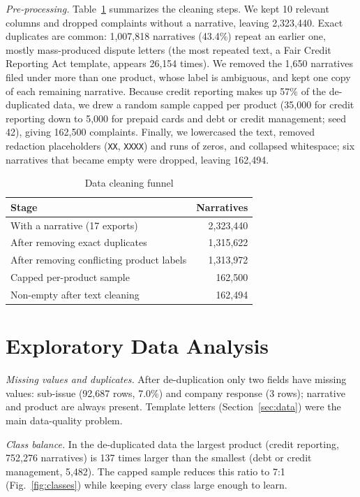 \documentclass[conference]{IEEEtran}
\begin{document}
\textit{Pre-processing.} Table~\ref{tab:funnel} summarizes the cleaning steps. We kept 10 relevant columns and dropped complaints without a narrative, leaving 2,323,440. Exact duplicates are common: 1,007,818 narratives (43.4\%) repeat an earlier one, mostly mass-produced dispute letters (the most repeated text, a Fair Credit Reporting Act template, appears 26,154 times). We removed the 1,650 narratives filed under more than one product, whose label is ambiguous, and kept one copy of each remaining narrative. Because credit reporting makes up 57\% of the de-duplicated data, we drew a random sample capped per product (35,000 for credit reporting down to 5,000 for prepaid cards and debt or credit management; seed 42), giving 162,500 complaints. Finally, we lowercased the text, removed redaction placeholders (\texttt{XX}, \texttt{XXXX}) and runs of zeros, and collapsed whitespace; six narratives that became empty were dropped, leaving 162,494.

\begin{table}[!t]
\caption{Data cleaning funnel}
\label{tab:funnel}
\centering
\footnotesize
\begin{tabular}{@{}lr@{}}
\toprule
Stage & Narratives \\
\midrule
With a narrative (17 exports) & 2,323,440 \\
After removing exact duplicates & 1,315,622 \\
After removing conflicting product labels & 1,313,972 \\
Capped per-product sample & 162,500 \\
Non-empty after text cleaning & 162,494 \\
\bottomrule
\end{tabular}
\end{table}

\section{Exploratory Data Analysis}
\textit{Missing values and duplicates.} After de-duplication only two fields have missing values: sub-issue (92,687 rows, 7.0\%) and company response (3 rows); narrative and product are always present. Template letters (Section~\ref{sec:data}) were the main data-quality problem.

\textit{Class balance.} In the de-duplicated data the largest product (credit reporting, 752,276 narratives) is 137 times larger than the smallest (debt or credit management, 5,482). The capped sample reduces this ratio to 7:1 (Fig.~\ref{fig:classes}) while keeping every class large enough to learn.
\end{document}
